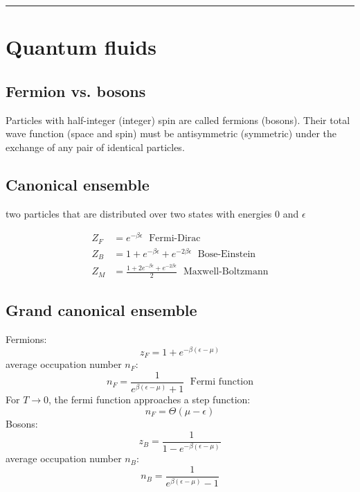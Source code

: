\noindent\rule[1ex]{\textwidth/5}{1pt}
\section{Quantum fluids}

\subsection*{Fermion vs. bosons}
Particles with half-integer (integer) spin are called fermions (bosons). Their
total wave function (space and spin) must be antisymmetric (symmetric)
under the exchange of any pair of identical particles.

\subsection*{Canonical ensemble}
two particles that are distributed over two states with energies 0 and $\epsilon$

\begin{equation*}
    \begin{aligned}
        Z_F &= e^{-\beta \epsilon} \; \text{ Fermi-Dirac} \\
        Z_B &= 1+ e^{-\beta \epsilon} + e^{-2\beta \epsilon} \; \text{ Bose-Einstein} \\
        Z_M &= \frac{1+ 2e^{-\beta \epsilon} + e^{-2\beta \epsilon}}{2} \; \text{ Maxwell-Boltzmann}
    \end{aligned}
\end{equation*}

\subsection*{Grand canonical ensemble}
Fermions:
\begin{equation*}
    z_F = 1+e^{-\beta(\epsilon-\mu)}
\end{equation*}
average occupation number $n_F$:
\begin{equation*}
    n_F = \frac{1}{e^{\beta(\epsilon - \mu)}+1} \; \text{ Fermi function}
\end{equation*}
For $T \rightarrow 0$, the fermi function approaches a step function:
\begin{equation*}
    n_F = \Theta (\mu - \epsilon)
\end{equation*}
Bosons:
\begin{equation*}
    z_B = \frac{1}{1-e^{-\beta(\epsilon-\mu)}}
\end{equation*}
average occupation number $n_B$:
\begin{equation*}
    n_B = \frac{1}{e^{\beta(\epsilon - \mu)}-1}
\end{equation*}

